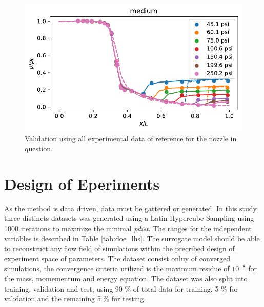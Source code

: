 \begin{figure}[h]
  \centering
  \includegraphics[width=\linewidth]{Figuras/validation/validation_medium.pdf}
  \caption{Validation using all experimental data of reference \cite{Back1965a} for the nozzle in question.}
  \label{fig:validation_su2}
\end{figure}

\section{Design of Eperiments}

As the method is data driven, data must be gattered or generated. In this study three distincts datasets was generated using a Latin Hypercube Sampling using 1000 iterations to maximize the minimal \textit{pdist}. The ranges for the independent variables is described in Table \ref{tab:doe_lhs}. The surrogate model should be able to reconstruct any flow field of simulations within the precribed design of experiment space of parameters. The dataset consist onluy of converged simulations, the convergence criteria utilized is the maximum residue of $10^{-8}$ for the mass, momementum and energy equation. The dataset was also split into training, validation and test, using $90$ \% of total data for training, 5 \% for validation and the remaining 5 \% for testing.

